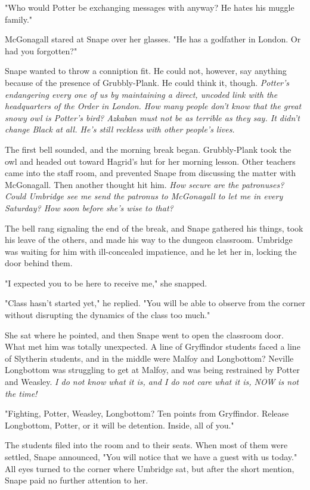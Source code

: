 "Who would Potter be exchanging messages with anyway? He hates his muggle family."

McGonagall stared at Snape over her glasses. "He has a godfather in London. Or had you forgotten?"

Snape wanted to throw a conniption fit. He could not, however, say anything because of the presence of Grubbly-Plank. He could think it, though. \emph{Potter's endangering every one of us by maintaining a direct, uncoded link with the headquarters of the Order in London. How many people don't know that the great snowy owl is Potter's bird? Azkaban must not be as terrible as they say. It didn't change Black at all. He's still reckless with other people's lives.}

The first bell sounded, and the morning break began. Grubbly-Plank took the owl and headed out toward Hagrid's hut for her morning lesson. Other teachers came into the staff room, and prevented Snape from discussing the matter with McGonagall. Then another thought hit him. \emph{How secure are the patronuses? Could Umbridge see me send the patronus to McGonagall to let me in every Saturday? How soon before she's wise to that?}

The bell rang signaling the end of the break, and Snape gathered his things, took his leave of the others, and made his way to the dungeon classroom. Umbridge was waiting for him with ill-concealed impatience, and he let her in, locking the door behind them.

"I expected you to be here to receive me," she snapped.

"Class hasn't started yet," he replied. "You will be able to observe from the corner without disrupting the dynamics of the class too much."

She sat where he pointed, and then Snape went to open the classroom door. What met him was totally unexpected. A line of Gryffindor students faced a line of Slytherin students, and in the middle were Malfoy and{\el} Longbottom? Neville Longbottom was struggling to get at Malfoy, and was being restrained by Potter and Weasley. \emph{I do not know what it is, and I do not care what it is, NOW is not the time!}

"Fighting, Potter, Weasley, Longbottom? Ten points from Gryffindor. Release Longbottom, Potter, or it will be detention. Inside, all of you."

The students filed into the room and to their seats. When most of them were settled, Snape announced, "You will notice that we have a guest with us today." All eyes turned to the corner where Umbridge sat, but after the short mention, Snape paid no further attention to her.

